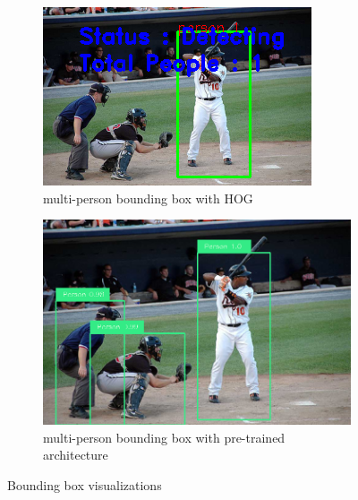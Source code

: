 \documentclass[11pt, letterpaper]{article}
\begin{document}
\begin{figure}[h]
    \centering
    \begin{subfigure}{0.4\textwidth}
        \centering
        \includegraphics[width=0.8\linewidth]{multi-person_HOG_bbox.png}
        \caption{multi-person bounding box with HOG}
    \end{subfigure}
    \begin{subfigure}{0.4\textwidth}
        \centering
        \includegraphics[width=0.8\linewidth]{multi-person_pre-trained_bbox.png}
        \caption{multi-person bounding box with pre-trained architecture}
    \end{subfigure}
    \caption{Bounding box visualizations}
    \label{fig:multi_person_results}
\end{figure}
\end{document}
